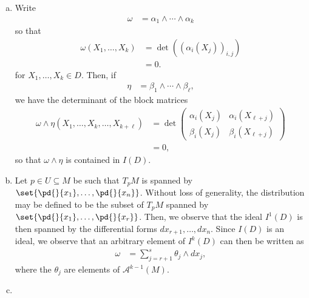 \documentclass[10pt]{mypackage}
\begin{document}
\begin{solution}\hfill
  \begin{enumerate}[(a)]
    \item Write
      \begin{align*}
        \omega &= \alpha_1\wedge\cdots\wedge \alpha_k
      \end{align*}
      so that
      \begin{align*}
        \omega\left( X_1,\dots,X_k \right) &= \det\left( \left( \alpha_{i}\left( X_j \right) \right)_{i,j} \right)\\
                                           &= 0.
      \end{align*}
      for $X_1,\dots,X_k\in D$. Then, if
      \begin{align*}
        \eta &= \beta_1\wedge\cdots\wedge \beta_{\ell},
      \end{align*}
      we have the determinant of the block matrices
      \begin{align*}
        \omega\wedge\eta \left( X_1,\dots,X_{k},\dots,X_{k + \ell} \right) &= \det \begin{pmatrix}\alpha_{i}\left( X_j \right) & \alpha_{i}\left( X_{\ell + j} \right) \\ \beta_{i}\left( X_j \right) & \beta_i \left( X_{\ell + j} \right)\end{pmatrix}\\
                                                                           &= 0,
      \end{align*}
      so that $\omega\wedge\eta$ is contained in $I(D)$.
    \item Let $p\in U\subseteq M$ be such that $T_pM$ is spanned by $ \set{ \pd{}{x_1},\dots, \pd{}{x_n} } $. Without loss of generality, the distribution may be defined to be the subset of $T_pM$ spanned by $ \set{ \pd{}{x_1},\dots, \pd{}{x_r} } $. Then, we observe that the ideal $I^{1}(D)$ is then spanned by the differential forms $dx_{r+1},\dots,dx_{n}$. Since $I(D)$ is an ideal, we observe that an arbitrary element of $I^{k}\left( D \right)$ can then be written as
      \begin{align*}
        \omega &= \sum_{j=r+1}^{s} \theta_{j} \wedge dx_j,
      \end{align*}
      where the $\theta_{j}$ are elements of $ \mathcal{A}^{k-1}\left( M \right) $.
    \item 
  \end{enumerate}
\end{solution}
\end{document}
